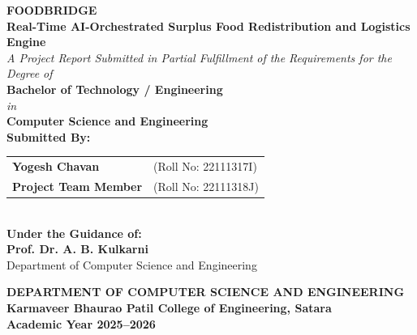 \documentclass[12pt,a4paper,oneside]{report}
\begin{document}
\begin{titlepage}
    \centering
    \vspace*{0.5cm}
    
    {\Huge \textbf{\color{ThemeColor} FOODBRIDGE}}\\[0.4cm]
    {\LARGE \textbf{Real-Time AI-Orchestrated Surplus Food Redistribution and Logistics Engine}}\\[1.5cm]
    
    \textit{A Project Report Submitted in Partial Fulfillment of the Requirements for the Degree of}\\[0.4cm]
    \textbf{Bachelor of Technology / Engineering}\\[0.2cm]
    \textit{in}\\[0.2cm]
    \textbf{Computer Science and Engineering}\\[1.5cm]
    
    \textbf{Submitted By:}\\[0.3cm]
    \begin{tabular}{ll}
        \textbf{Yogesh Chavan} & (Roll No: 22111317I) \\
        \textbf{Project Team Member} & (Roll No: 22111318J) \\
    \end{tabular}\\[1.5cm]
    
    \textbf{Under the Guidance of:}\\[0.3cm]
    \textbf{Prof. Dr. A. B. Kulkarni}\\
    Department of Computer Science and Engineering\\[1.5cm]
    
    \vfill
    
    \textbf{DEPARTMENT OF COMPUTER SCIENCE AND ENGINEERING}\\
    \textbf{Karmaveer Bhaurao Patil College of Engineering, Satara}\\
    \textbf{Academic Year 2025--2026}
\end{titlepage}

\setcounter{page}{2}
\end{document}
